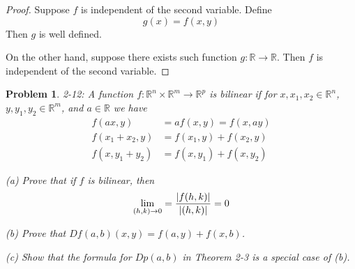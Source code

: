 \documentclass[12pt]{book}
\newtheorem*{problem*}{Problem}
\begin{document}
\begin{proof}
  Suppose $f$ is independent of the second variable. Define
  \[
  g(x) = f(x, y) 
  \]
  Then $g$ is well defined.

  On the other hand, suppose there exists such function $g : \mathbb{R} \to \mathbb{R}$. Then $f$ is independent of the second variable. 
\end{proof}

\begin{problem*}
  2-12: A function $f : \mathbb{R}^n \times \mathbb{R}^m \to \mathbb{R}^p$ is bilinear if for $x, x_1, x_2 \in \mathbb{R}^n$, $y, y_1, y_2 \in \mathbb{R}^m$, and $a \in \mathbb{R}$ we have
    \begin{align*}
    f(ax, y) &= af(x,y) = f(x, ay)\\
    f(x_1 + x_2 , y) &= f(x_1, y) + f(x_2, y)\\
    f(x, y_1 + y_2) &= f(x, y_1) + f(x, y_2)
  \end{align*}

    (a) Prove that if $f$ is bilinear, then
    \[
    \lim_{(h,k) \to 0} = \frac{\abs{f(h,k)}}{\abs{(h,k)}} = 0
    \]

    (b) Prove that $Df(a,b)(x,y) = f(a,y) + f(x,b)$.

    (c) Show that the formula for $Dp(a,b)$ in Theorem 2-3 is a special case of (b). 
      
\end{problem*}
\end{document}
